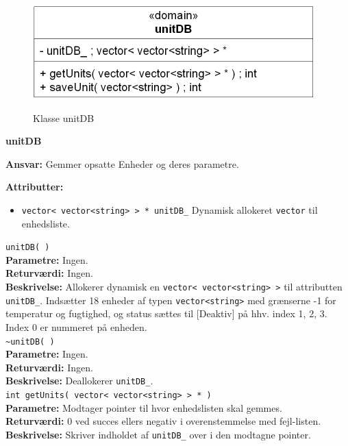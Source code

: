 \newpage

\begin{figure}[htbp] \centering
{\includegraphics[scale=1.5]{filer/design/Klassediagrammer/sw_unitDB}}
\caption{Klasse unitDB}
\label{fig:unitDB klassediagram}
\end{figure} 

{\centering
\textbf{unitDB}\par
}
\textbf{Ansvar:} Gemmer opsatte Enheder og deres parametre. \

\textbf{Attributter:}
\begin{itemize}
	\item \verb+vector< vector<string> > * unitDB_+ Dynamisk allokeret \verb+vector+ til enhedsliste.
\end{itemize}

\verb+unitDB( ) +\\
\textbf{Parametre:} Ingen.\\
\textbf{Returværdi:} Ingen. \\
\textbf{Beskrivelse:} Allokerer dynamisk en \verb+vector< vector<string> >+ til attributten \verb+unitDB_+. Indsætter 18 enheder af typen \verb+vector<string>+ med grænserne -1 for temperatur og fugtighed, og status sættes til [Deaktiv] på hhv. index 1, 2, 3. Index 0 er nummeret på enheden. \\

\verb+~unitDB( ) +\\
\textbf{Parametre:} Ingen.\\
\textbf{Returværdi:} Ingen. \\
\textbf{Beskrivelse:} Deallokerer \verb+unitDB_+. \\

\verb+int getUnits( vector< vector<string> > * ) +\\
\textbf{Parametre:} Modtager pointer til hvor enhedslisten skal gemmes.\\
\textbf{Returværdi:} 0 ved succes ellers negativ i overenstemmelse med fejl-listen. \\
\textbf{Beskrivelse:} Skriver indholdet af \verb+unitDB_+ over i den modtagne pointer. \\

